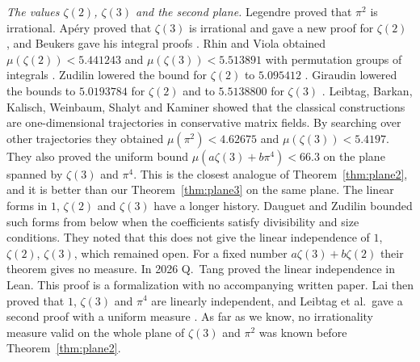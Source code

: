 \documentclass[11pt]{amsart}
\theoremstyle{definition}
\theoremstyle{remark}
\numberwithin{equation}{section}
\begin{document}
\emph{The values $\zeta(2)$, $\zeta(3)$ and the second plane.} Legendre proved that $\pi^2$ is irrational. Ap\'ery
proved that $\zeta(3)$ is irrational and gave a new proof for $\zeta(2)$ \cite{Apery79}, and Beukers gave his integral proofs \cite{Beukers79}. Rhin and Viola obtained
$\mu(\zeta(2))<5.441243$ and $\mu(\zeta(3))<5.513891$ with permutation groups of integrals \cite{RhinViola96,RhinViola01}.
Zudilin lowered the bound for $\zeta(2)$ to $5.095412$ \cite{Zudilin14}. Giraudin lowered the bounds to $5.0193784$ for
$\zeta(2)$ \cite{Giraudin26} and to $5.5138800$ for $\zeta(3)$ \cite{Giraudin26z3}. Leibtag, Barkan, Kalisch, Weinbaum,
Shalyt and Kaminer \cite{LBKWSK26} showed that the classical constructions are one-dimensional trajectories in
conservative matrix fields. By searching over other trajectories they obtained $\mu(\pi^2)<4.62675$ and
$\mu(\zeta(3))<5.4197$. They also proved the uniform bound $\mu(a\zeta(3)+b\pi^4)<66.3$ on the plane spanned by
$\zeta(3)$ and $\pi^4$. This is the closest analogue of Theorem~\ref{thm:plane2}, and it is better than our
Theorem~\ref{thm:plane3} on the same plane.
The linear forms in $1$, $\zeta(2)$
and $\zeta(3)$ have a longer history. Dauguet and Zudilin \cite{DauguetZudilin14} bounded such forms from below when
the coefficients satisfy divisibility and size conditions. They noted that this does not give the linear independence of
$1$, $\zeta(2)$, $\zeta(3)$, which remained open. For a fixed number $a\zeta(3)+b\zeta(2)$ their theorem
gives no measure. In 2026 Q.~Tang \cite{Tang26} proved the linear independence in Lean. This proof is a formalization
with no accompanying written paper. Lai
\cite{Lai2026} then proved that $1$, $\zeta(3)$ and $\pi^4$ are linearly independent, and Leibtag et al.\ gave a
second proof with a uniform measure \cite{LBKWSK26}. As far as we know, no
irrationality measure valid on the whole plane of $\zeta(3)$ and $\pi^2$ was known before Theorem~\ref{thm:plane2}.
\end{document}
